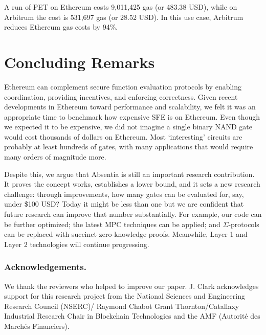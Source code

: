 A run of PET on Ethereum costs 9,011,425 gas (or 483.38 USD), while on Arbitrum the cost is 531,697 gas (or 28.52 USD). In this use case, Arbitrum reduces Ethereum gas costs by 94\%.  


\section{Concluding Remarks}

Ethereum can complement secure function evaluation protocols by enabling coordination, providing incentives, and enforcing correctness. Given recent developments in Ethereum toward performance and scalability, we felt it was an appropriate time to benchmark how expensive SFE is on Ethereum. Even though we expected it to be expensive, we did not imagine a single binary NAND gate would cost thousands of dollars on Ethereum. Most `interesting' circuits are probably at least hundreds of gates, with many applications that would require many orders of magnitude more.

Despite this, we argue that Absentia is still an important research contribution. It proves the concept works, establishes a  lower bound, and it sets a new research challenge: through improvements, how many gates can be evaluated for, say, under \$100 USD? Today it might be less than one but we are confident that future research can improve that number substantially. For example, our code can be further optimized; the latest MPC techniques can be applied; and $\Sigma$-protocols can be replaced with succinct zero-knowledge proofs. Meanwhile, Layer 1 and Layer 2 technologies will continue progressing.

\subsubsection*{Acknowledgements.} We thank the reviewers who helped to improve our paper. J. Clark acknowledges support for this research project from the National Sciences and Engineering Research Council (NSERC)/ Raymond Chabot Grant Thornton/Catallaxy Industrial Research Chair in Blockchain Technologies and the AMF (Autorité des Marchés Financiers).


